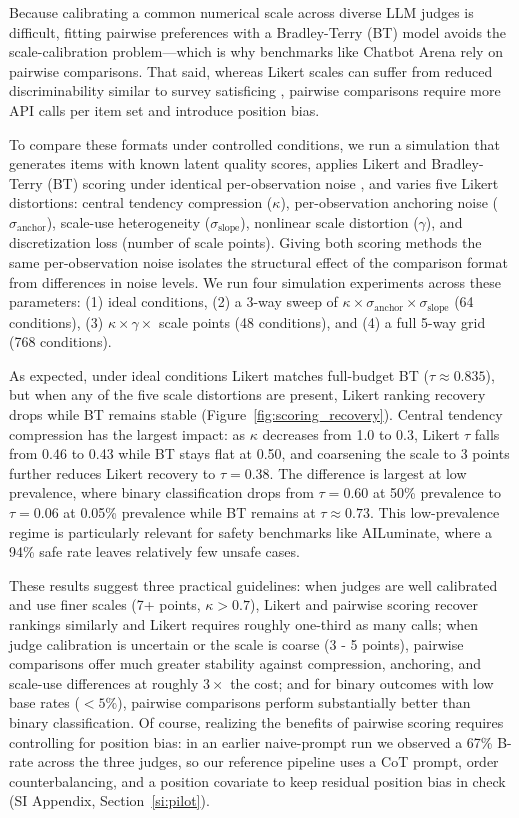 Because calibrating a common numerical scale across diverse LLM judges is difficult, fitting pairwise preferences with a Bradley-Terry (BT) model avoids the scale-calibration problem—which is why benchmarks like Chatbot Arena \citep{chiang2024chatbot} rely on pairwise comparisons. That said, whereas Likert scales can suffer from reduced discriminability similar to survey satisficing \citep{krosnick1991response}, pairwise comparisons require more API calls per item set and introduce position bias.

To compare these formats under controlled conditions, we run a simulation that generates items with known latent quality scores, applies Likert and Bradley-Terry (BT) scoring under identical per-observation noise \citep{peysakhovich2015pairwise}, and varies five Likert distortions: central tendency compression ($\kappa$), per-observation anchoring noise ($\sigma_\text{anchor}$), scale-use heterogeneity ($\sigma_\text{slope}$), nonlinear scale distortion ($\gamma$), and discretization loss (number of scale points). Giving both scoring methods the same per-observation noise isolates the structural effect of the comparison format from differences in noise levels. We run four simulation experiments across these parameters: (1) ideal conditions, (2) a 3-way sweep of $\kappa \times \sigma_\text{anchor} \times \sigma_\text{slope}$ (64 conditions), (3) $\kappa \times \gamma \times$ scale points (48 conditions), and (4) a full 5-way grid (768 conditions).

As expected, under ideal conditions Likert matches full-budget BT ($\tau \approx 0.835$), but when any of the five scale distortions are present, Likert ranking recovery drops while BT remains stable (Figure~\ref{fig:scoring_recovery}). Central tendency compression has the largest impact: as $\kappa$ decreases from 1.0 to 0.3, Likert $\tau$ falls from 0.46 to 0.43 while BT stays flat at 0.50, and coarsening the scale to 3 points further reduces Likert recovery to $\tau = 0.38$. The difference is largest at low prevalence, where binary classification drops from $\tau = 0.60$ at 50\% prevalence to $\tau = 0.06$ at 0.05\% prevalence while BT remains at $\tau \approx 0.73$. This low-prevalence regime is particularly relevant for safety benchmarks like AILuminate, where a 94\% safe rate leaves relatively few unsafe cases.

These results suggest three practical guidelines: when judges are well calibrated and use finer scales (7+ points, $\kappa > 0.7$), Likert and pairwise scoring recover rankings similarly and Likert requires roughly one-third as many calls; when judge calibration is uncertain or the scale is coarse (3 - 5 points), pairwise comparisons offer much greater stability against compression, anchoring, and scale-use differences at roughly $3\times$ the cost; and for binary outcomes with low base rates ($<5\%$), pairwise comparisons perform substantially better than binary classification. Of course, realizing the benefits of pairwise scoring requires controlling for position bias: in an earlier naive-prompt run we observed a 67\% B-rate across the three judges, so our reference pipeline uses a CoT prompt, order counterbalancing, and a position covariate to keep residual position bias in check (SI Appendix, Section~\ref{si:pilot}).

